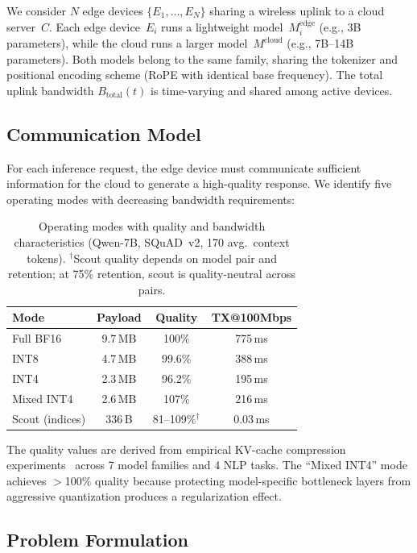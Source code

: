 \documentclass[conference]{IEEEtran}
\begin{document}
We consider $N$ edge devices $\{E_1, \ldots, E_N\}$ sharing a wireless uplink to a cloud server~$C$.
Each edge device~$E_i$ runs a lightweight model~$M_i^{\text{edge}}$ (e.g., 3B parameters), while the cloud runs a larger model~$M^{\text{cloud}}$ (e.g., 7B--14B parameters).
Both models belong to the same family, sharing the tokenizer and positional encoding scheme (RoPE with identical base frequency).
The total uplink bandwidth $B_{\text{total}}(t)$ is time-varying and shared among active devices.

\subsection{Communication Model}

For each inference request, the edge device must communicate sufficient information for the cloud to generate a high-quality response.
We identify five operating modes with decreasing bandwidth requirements:

\begin{table}[t]
\centering
\caption{Operating modes with quality and bandwidth characteristics (Qwen-7B, SQuAD~v2, 170 avg.\ context tokens). $^\dagger$Scout quality depends on model pair and retention; at 75\% retention, scout is quality-neutral across pairs.}
\label{tab:operating_points}
\small
\begin{tabular}{@{}lccc@{}}
\toprule
\textbf{Mode} & \textbf{Payload} & \textbf{Quality} & \textbf{TX@100Mbps} \\
\midrule
Full BF16       & 9.7\,MB   & 100\%  & 775\,ms \\
INT8            & 4.7\,MB   & 99.6\% & 388\,ms \\
INT4            & 2.3\,MB   & 96.2\% & 195\,ms \\
Mixed INT4      & 2.6\,MB   & 107\%  & 216\,ms \\
Scout (indices) & 336\,B    & 81--109\%$^\dagger$ & 0.03\,ms \\
\bottomrule
\end{tabular}
\end{table}

The quality values are derived from empirical KV-cache compression experiments~\cite{paperA} across 7 model families and 4 NLP tasks.
The ``Mixed INT4'' mode achieves $>$100\% quality because protecting model-specific bottleneck layers from aggressive quantization produces a regularization effect.

\subsection{Problem Formulation}
\end{document}
